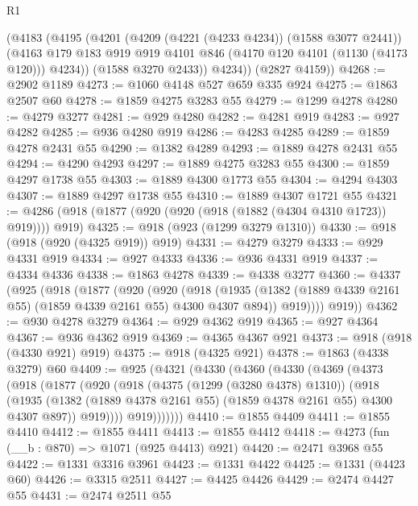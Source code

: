 \begin{lexlean}{R1}
\begin{coremodule}
        (@4183
          (@4195
            (@4201
              (@4209 (@4221 (@4233 @4234)) (@1588 @3077 @2441))
              (@4163 @179 @183 @919 @919 @4101 @846 (@4170 @120 @4101 (@1130 (@4173 @120))) @4234))
            (@1588 @3270 @2433))
          @4234))
      (@2827 @4159))
@4268 := @2902 @1189
@4273 := @1060 @4148 @527 @659 @335 @924
@4275 := @1863 @2507 @60
@4278 := @1859 @4275 @3283 @55
@4279 := @1299 @4278
@4280 := @4279 @3277
@4281 := @929 @4280
@4282 := @4281 @919
@4283 := @927 @4282
@4285 := @936 @4280 @919
@4286 := @4283 @4285
@4289 := @1859 @4278 @2431 @55
@4290 := @1382 @4289
@4293 := @1889 @4278 @2431 @55
@4294 := @4290 @4293
@4297 := @1889 @4275 @3283 @55
@4300 := @1859 @4297 @1738 @55
@4303 := @1889 @4300 @1773 @55
@4304 := @4294 @4303
@4307 := @1889 @4297 @1738 @55
@4310 := @1889 @4307 @1721 @55
@4321 := @4286 (@918 (@1877 (@920 (@920 (@918 (@1882 (@4304 @4310 @1723)) @919)))) @919)
@4325 := @918 (@923 (@1299 @3279 @1310))
@4330 := @918 (@918 (@920 (@4325 @919)) @919)
@4331 := @4279 @3279
@4333 := @929 @4331 @919
@4334 := @927 @4333
@4336 := @936 @4331 @919
@4337 := @4334 @4336
@4338 := @1863 @4278
@4339 := @4338 @3277
@4360 := @4337
    (@925
      (@918
        (@1877
          (@920
            (@920
              (@918
                (@1935 (@1382 (@1889 @4339 @2161 @55) (@1859 @4339 @2161 @55) @4300 @4307 @894))
                @919))))
        @919))
@4362 := @930 @4278 @3279
@4364 := @929 @4362 @919
@4365 := @927 @4364
@4367 := @936 @4362 @919
@4369 := @4365 @4367 @921
@4373 := @918 (@918 (@4330 @921) @919)
@4375 := @918 (@4325 @921)
@4378 := @1863 (@4338 @3279) @60
@4409 := @925
    (@4321
      (@4330
        (@4360
          (@4330
            (@4369
              (@4373
                (@918
                  (@1877
                    (@920
                      (@918
                        (@4375 (@1299 (@3280 @4378) @1310))
                        (@918
                          (@1935
                            (@1382
                              (@1889 @4378 @2161 @55)
                              (@1859 @4378 @2161 @55)
                              @4300
                              @4307
                              @897))
                          @919))))
                  @919)))))))
@4410 := @1855 @4409
@4411 := @1855 @4410
@4412 := @1855 @4411
@4413 := @1855 @4412
@4418 := @4273 (fun (__b : @870) => @1071 (@925 @4413) @921)
@4420 := @2471 @3968 @55
@4422 := @1331 @3316 @3961
@4423 := @1331 @4422
@4425 := @1331 (@4423 @60)
@4426 := @3315 @2511
@4427 := @4425 @4426
@4429 := @2474 @4427 @55
@4431 := @2474 @2511 @55

\end{coremodule}
\end{lexlean}
